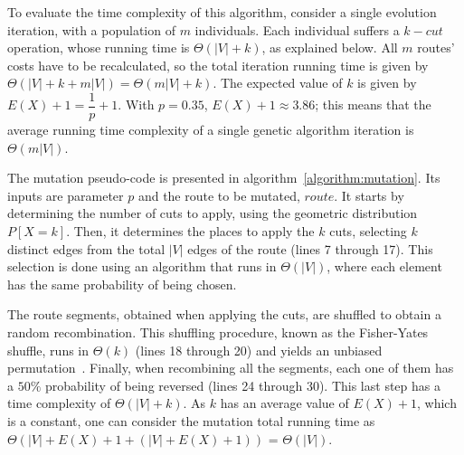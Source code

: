 To evaluate the time complexity of this algorithm, consider a single evolution
iteration, with a population of $m$ individuals. Each individual suffers a
$k-cut$ operation, whose running time is $\Theta(|V| + k)$, as explained below.
All $m$ routes' costs have to be recalculated, so the total iteration running
time is given by $\Theta(|V| + k + m|V|) = \Theta(m|V| + k)$. The expected
value of $k$ is given by $E(X) + 1 = \dfrac{1}{p} + 1$.  With $p = 0.35$, $E(X)
+ 1 \approx 3.86$; this means that the average running time complexity of a
single genetic algorithm iteration is $\Theta(m|V|)$.

The mutation pseudo-code is presented in algorithm~\ref{algorithm:mutation}. Its
inputs are parameter $p$ and the route to be mutated, $route$. It starts by
determining the number of cuts to apply, using the geometric distribution $P[X =
k]$. Then, it determines the places to apply the $k$ cuts, selecting $k$
distinct edges from the total $|V|$ edges of the route (lines 7 through 17).
This selection is done using an algorithm that runs in $\Theta(|V|)$, where each
element has the same probability of being chosen.

The route segments, obtained when applying the cuts, are shuffled to obtain a
random recombination. This shuffling procedure, known as the Fisher-Yates
shuffle, runs in $\Theta(k)$ (lines 18 through 20) and yields an unbiased
permutation~\citep{Knuth1997b}. Finally, when recombining all the segments,
each one of them has a $50\%$ probability of being reversed (lines 24 through
30). This last step has a time complexity of $\Theta(|V| + k)$. As $k$ has an
average value of $E(X)+1$, which is a constant, one can consider the mutation
total running time as $\Theta(|V|+E(X)+1+(|V|+E(X)+1))$ = $\Theta(|V|)$.

